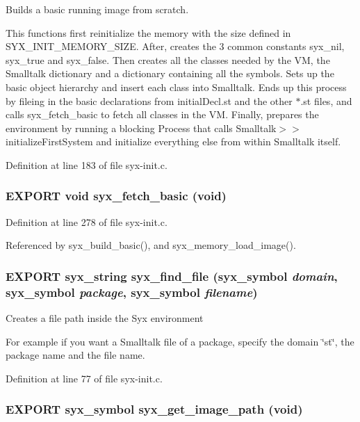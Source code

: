 Builds a basic running image from scratch.

This functions first reinitialize the memory with the size defined in SYX\_\-INIT\_\-MEMORY\_\-SIZE. After, creates the 3 common constants syx\_\-nil, syx\_\-true and syx\_\-false. Then creates all the classes needed by the VM, the Smalltalk dictionary and a dictionary containing all the symbols. Sets up the basic object hierarchy and insert each class into Smalltalk. Ends up this process by fileing in the basic declarations from initialDecl.st and the other $\ast$.st files, and calls syx\_\-fetch\_\-basic to fetch all classes in the VM. Finally, prepares the environment by running a blocking Process that calls Smalltalk$>$$>$initializeFirstSystem and initialize everything else from within Smalltalk itself. 

Definition at line 183 of file syx-init.c.\hypertarget{syx-init_8h_c06c3bb03991f52f068cee7e52ff868e}{
\subsubsection{\setlength{\rightskip}{0pt plus 5cm}EXPORT void syx\_\-fetch\_\-basic (void)}}
\label{syx-init_8h_c06c3bb03991f52f068cee7e52ff868e}




Definition at line 278 of file syx-init.c.

Referenced by syx\_\-build\_\-basic(), and syx\_\-memory\_\-load\_\-image().\hypertarget{syx-init_8h_43bb2f31e76b9593fb55491d90da7671}{
\subsubsection{\setlength{\rightskip}{0pt plus 5cm}EXPORT {\bf syx\_\-string} syx\_\-find\_\-file ({\bf syx\_\-symbol} {\em domain}, \/  {\bf syx\_\-symbol} {\em package}, \/  {\bf syx\_\-symbol} {\em filename})}}
\label{syx-init_8h_43bb2f31e76b9593fb55491d90da7671}


Creates a file path inside the Syx environment

For example if you want a Smalltalk file of a package, specify the domain \char`\"{}st\char`\"{}, the package name and the file name. 

Definition at line 77 of file syx-init.c.\hypertarget{syx-init_8h_e7f1ad973d8e6155ee3761cac438111f}{
\subsubsection{\setlength{\rightskip}{0pt plus 5cm}EXPORT {\bf syx\_\-symbol} syx\_\-get\_\-image\_\-path (void)}}
\label{syx-init_8h_e7f1ad973d8e6155ee3761cac438111f}



